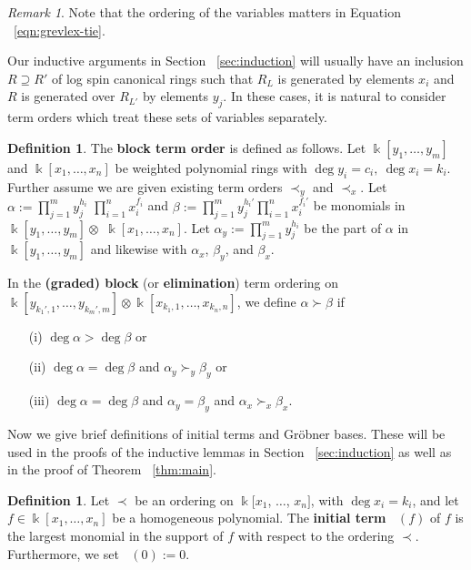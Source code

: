 \documentclass{amsart}
\theoremstyle{plain}
\theoremstyle{definition}
\newtheorem{defn}[thm]{Definition}
\theoremstyle{remark}
\newtheorem{rem}[thm]{Remark}
\numberwithin{equation}{section}
\newcommand\Bk{{\Bbbk}}
\newcommand{\halfcan}{L}
\DeclareMathOperator{\initial}{in_\prec}
\begin{document}
\begin{rem}
Note that the ordering of the variables matters in Equation
~\ref{eqn:grevlex-tie}.
\end{rem}

Our inductive arguments in Section ~\ref{sec:induction} will
usually have an inclusion $R \supseteq R'$ of log spin canonical
rings such that $R_\halfcan$ is generated by elements $x_{i}$ and $R$
is generated over $R_{\halfcan'}$ by elements $y_j$. In these cases, it is
natural to consider term orders which treat these sets of variables
separately.

\begin{defn}
\label{defn:block-order}
The \textbf{block term order} is defined as follows. Let $\Bk[y_{1}, \ldots, y_{m}]$ and $\Bk[x_{1}, \ldots,
x_{n}]$ be weighted polynomial rings with $\deg y_i = c_i, \: \deg x_i = k_i.$ Further assume we are given existing term
orders $\prec_y$ and $\prec_x$. Let $\alpha :=
\prod_{j = 1}^{m} y_{j}^{h_i}$ $\prod_{i = 1}^{n} x_{i}
^{f_i}$ and $\beta := \prod_{j = 1}^{m} y_{j}^{h_i'}
\prod_{i = 1}^{n} x_{i}^{f_i'}$ be monomials in $\Bk[y_{1},
\ldots, y_{m}] \otimes$ $\Bk[x_{1}, \ldots, x_{n}]$.
Let $\alpha_y := \prod_{j = 1}^{m} y_{j}^{h_i}$ be the
part of $\alpha$ in $\Bk[y_{1}, \ldots, y_{m}]$ and
likewise with $\alpha_x$, $\beta_y$, and $\beta_x$.

In the \textbf{(graded) block} (or \textbf{elimination}) term
ordering on $\Bk[y_{k_1', 1}, \ldots, y_{k_m', m}] \otimes \Bk[x_{k_1, 1},
\ldots, x_{k_n, n}]$, we define $\alpha \succ \beta$ if
  \begin{enumerate}
	\item[(i)] $\deg \alpha  > \deg \beta$ or
  \item[(ii)] $\deg \alpha = \deg \beta$ and $\alpha_y \succ_y \beta_y$ or
	\item[(iii)] $\deg \alpha = \deg \beta$ and $\alpha_y = \beta_y$ and $\alpha_x \succ_x \beta_x$.
  \end{enumerate}
\end{defn}

Now we give brief definitions of initial terms and Gr\"{o}bner
bases. These will be used in the proofs of the inductive lemmas
in Section ~\ref{sec:induction} as well as in the proof of Theorem
~\ref{thm:main}.

\begin{defn}
\label{defn:initial-term}
Let $\prec$ be an ordering on $\Bk[x_{1}$, $\ldots$, $x_{n}]$, 
with $\deg x_i = k_i$,
and let $f \in \Bk[x_{1}, \ldots, x_{n}]$ be a homogeneous
polynomial. The \textbf{initial term} $\initial(f)$ of $f$
is the largest monomial in the support of $f$ with respect to
the ordering $\prec$. Furthermore, we set $\initial(0) := 0$.
\end{defn}
\end{document}
